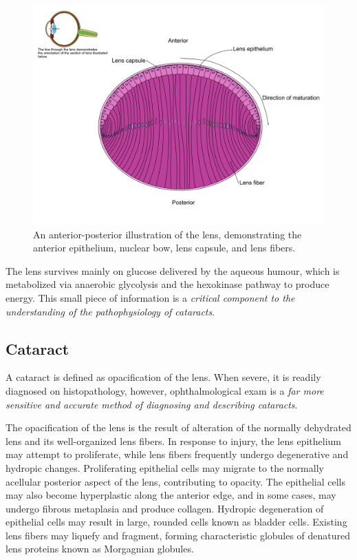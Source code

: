 \documentclass[openany]{article}
\begin{document}
\begin{figure}

{\centering \includegraphics[width=0.6\linewidth]{images/lens3x} 

}

\caption{An anterior-posterior illustration of the lens, demonstrating the anterior epithelium, nuclear bow, lens capsule, and lens fibers.}\label{fig:lens}
\end{figure}

The lens survives mainly on glucose delivered by the aqueous humour,
which is metabolized via anaerobic glycolysis and the hexokinase pathway
to produce energy. This small piece of information is a \emph{critical
component to the understanding of the pathophysiology of cataracts}.

\subsection{Cataract}\label{cataract}

A cataract is defined as opacification of the lens. When severe, it is
readily diagnosed on histopathology, however, ophthalmological exam is a
\emph{far more sensitive and accurate method of diagnosing and
describing cataracts}.

The opacification of the lens is the result of alteration of the
normally dehydrated lens and its well-organized lens fibers. In response
to injury, the lens epithelium may attempt to proliferate, while lens
fibers frequently undergo degenerative and hydropic changes.
Proliferating epithelial cells may migrate to the normally acellular
posterior aspect of the lens, contributing to opacity. The epithelial
cells may also become hyperplastic along the anterior edge, and in some
cases, may undergo fibrous metaplasia and produce collagen. Hydropic
degeneration of epithelial cells may result in large, rounded cells
known as bladder cells. Existing lens fibers may liquefy and fragment,
forming characteristic globules of denatured lens proteins known as
Morgagnian globules.
\end{document}
